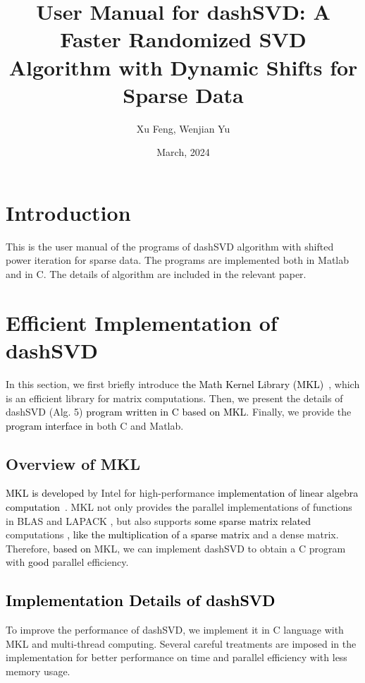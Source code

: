 \documentclass{ol-softwaremanual}
\title{User Manual for dashSVD: A Faster Randomized SVD Algorithm with Dynamic Shifts for Sparse Data}
\author{Xu Feng, Wenjian Yu}
\date{March, 2024}
\newcommand{\atn}[1]{\textcolor{black}{#1}}
\newcommand{\atnn}[1]{\textcolor{black}{#1}}
\begin{document}
\maketitle

\tableofcontents
\newpage

\section{Introduction}
This is the user manual of the programs of dashSVD algorithm with shifted power iteration for sparse data. The programs are implemented both in Matlab and in C. The details of algorithm are included in the relevant paper.

\section{Efficient Implementation of dashSVD}
In this section, we first briefly introduce \atnn{the Math Kernel Library (MKL)}~\cite{Intel}, which is an efficient library for matrix computations.
Then, we present the details of dashSVD (Alg. 5) \atnn{program written in C based on MKL}. Finally, we provide the \atnn{program interface in} both C and Matlab.

\subsection{Overview of MKL}

\atnn{MKL is developed} by Intel for high-performance \atnn{implementation of linear algebra computation}~\cite{Intel}. MKL not only provides \atnn{the} parallel implementations {of functions in BLAS \cite{BLAS} and LAPACK \cite{LAPACK}}, 
but also supports \atnn{some sparse matrix related} computations \atnn{, like the multiplication of a sparse matrix} and a dense matrix. Therefore, \atn{based on} MKL, we can implement dashSVD to obtain a C program with \atnn{good} parallel efficiency. 

\subsection{\atnn{Implementation Details of dashSVD}}
To improve the performance of dashSVD, we implement it in C language with MKL and multi-thread computing. Several careful treatments are imposed in the implementation for better performance on time and parallel efficiency with less memory usage. 
\end{document}
